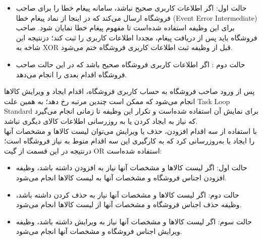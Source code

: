 \documentclass[14pt]{article}
\begin{document}
\begin{flushright}
\begin{itemize}
\item حالت اول: اگر اطلاعات کاربری صحیح نباشد، سامانه پیغام خطا را برای صاحب فروشگاه ارسال می‌کند که در اینجا از نماد پیغام خطا (Event Error Intermediate) برای این وظیفه استفاده شده‌است تا مفهوم پیغام خطا نمایان شود. صاحب فروشگاه باید پس از دریافت پیغام، مجددا اطلاعات کاربری را ثبت کند؛ درنتیجه این شاخه به XOR قبل از وظیفه ثبت اطلاعات کاربری فروشگاه ختم می‌شود.
\item حالت دوم : اگر اطلاعات کاربری فروشگاه صحیح باشد که در این حالت صاحب فروشگاه اقدام بعدی را انجام می‌دهد. 
\end{itemize}
\end{flushright}

پس از ورود صاحب فروشگاه به حساب کاربری فروشگاه، اقدام ایجاد و ویرایش کالا‌ها انجام می‌شود که ممکن است چندین مرتبه رخ دهد؛ به همین علت Task Loop Standard برای نمایش آن استفاده شده‌است و تکرار این وظیفه تا زمانی انجام می‌گیرد که نیاز به ایجاد کردن یا به روزرسانی اطلاعات کالای دیگری نباشد.\\
با استفاده از سه اقدام افزودن، حذف یا ویرایش می‌توان لیست کالا‌ها و مشخصات آنها را ایجاد یا به‌روزرسانی کرد که به کارگیری این سه اقدام منوط به نیاز فروشگاه است؛ درنتیجه در این قسمت از گیت OR استفاده شده‌است:
\begin{flushright}
\begin{itemize}
\item حالت اول: اگر لیست کالا‌ها و مشخصات آنها نیاز به افزودن داشته باشد، وظیفه افزودن اجناس فروشگاه و مشخصات آنها به لیست کالا‌ها انجام می‌شود.
\item حالت دوم: اگر لیست کالا‌ها و مشخصات آنها نیاز به حذف کردن داشته باشد، وظیفه حذف اجناس فروشگاه و مشخصات آنها از لیست کالا‌ها انجام می‌شود.
\item حالت سوم: اگر لیست کالا‌ها و مشخصات آنها نیاز به ویرایش داشته باشد، وظیفه ویرایش اجناس فروشگاه و مشخصات آنها انجام می‌شود.
\end{itemize}
\end{flushright}
\end{document}
